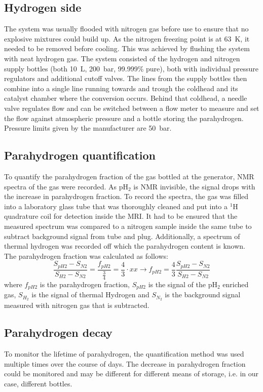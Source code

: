         \subsection{Hydrogen side}
            The system was usually flooded with nitrogen gas before use to ensure that no explosive mixtures could build up. As the nitrogen freezing point is at \SI{63}{\kelvin}, it needed to be removed before cooling. This was achieved by flushing the system with neat hydrogen gas. The system consisted of the hydrogen and nitrogen supply bottles (both \SI{10}{\liter}, \SI{200}{\bar}, 99.999\% pure), both with individual pressure regulators and additional cutoff valves. The lines from the supply bottles then combine into a single line running towards and trough the coldhead and its catalyst chamber where the conversion occurs. Behind that coldhead, a needle valve regulates flow and can be switched between a flow meter to measure and set the flow against atmospheric pressure and a bottle storing the parahydrogen. Pressure limits given by the manufacturer are \SI{50}{\bar}. 
        \subsection{Parahydrogen quantification}
            To quantify the parahydrogen fraction of the gas bottled at the generator, NMR spectra of the gas were recorded. As pH$_2$ is NMR invisible, the signal drops with the increase in parahydrogen fraction. To record the spectra, the gas was filled into a laboratory glass tube that was thoroughly cleaned and put into a $^{1}$H quadrature coil for detection inside the MRI. It had to be ensured that the measured spectrum was compared to a nitrogen sample inside the same tube to subtract background signal from tube and plug. Additionally, a spectrum of thermal hydrogen was recorded off which the parahydrogen content is known. The parahydrogen fraction was calculated as follows:
            \begin{equation}
                \frac{S_{pH2}-S_{N2}}{S_{H2}-S_{N2}} = \frac{f_{pH2}}{\tfrac{3}{4}} = \frac{4}{3} \cdot xx \rightarrow f_{pH2} = \frac{4}{3} \frac{S_{pH2}-S_{N2}}{S_{H2}-S_{N2}}
            \end{equation}
            where $f_{pH2}$ is the parahydrogen fraction, $S_{pH2}$ is the signal of the pH$_2$ enriched gas, $S_{H_2}$ is the signal of thermal Hydrogen and $S_{N_2}$ is the background signal measured with nitrogen gas that is subtracted.
        \subsection{Parahydrogen decay}
            To monitor the lifetime of parahydrogen, the quantification method was used multiple times over the course of days. The decrease in parahydrogen fraction could be monitored and may be different for different means of storage, i.e. in our case, different bottles.
